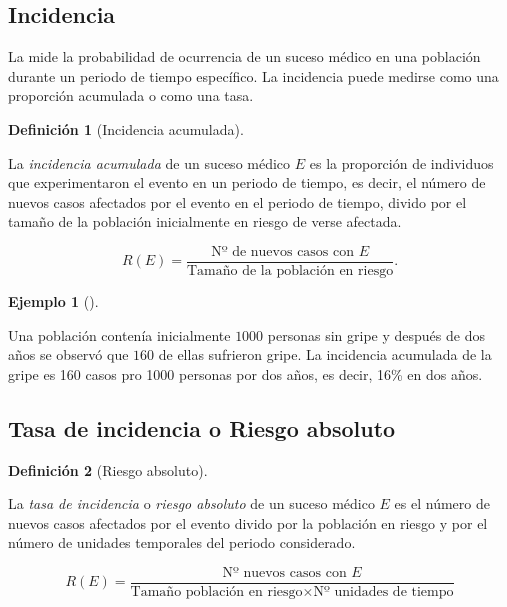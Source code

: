 \documentclass[
  spanish,
  a4paper,
]{scrreport}
\theoremstyle{plain}
\theoremstyle{definition}
\newtheorem{example}{Ejemplo}[chapter]
\theoremstyle{definition}
\newtheorem{definition}{Definición}[chapter]
\theoremstyle{remark}
\begin{document}
\subsection{Incidencia}\label{incidencia}

La mide la probabilidad de ocurrencia de un suceso médico en una
población durante un periodo de tiempo específico. La incidencia puede
medirse como una proporción acumulada o como una tasa.

\begin{definition}[Incidencia
acumulada]\protect\hypertarget{def-incidencia-acumulada}{}\label{def-incidencia-acumulada}

La \emph{incidencia acumulada} de un suceso médico \(E\) es la
proporción de individuos que experimentaron el evento en un periodo de
tiempo, es decir, el número de nuevos casos afectados por el evento en
el periodo de tiempo, divido por el tamaño de la población inicialmente
en riesgo de verse afectada.

\[R(E)=\frac{\mbox{Nº de nuevos casos con $E$}}{\mbox{Tamaño de la población en riesgo}}.\]

\end{definition}

\begin{example}[]\protect\hypertarget{exm-incidencia-acumulada}{}\label{exm-incidencia-acumulada}

Una población contenía inicialmente \(1000\) personas sin gripe y
después de dos años se observó que \(160\) de ellas sufrieron gripe. La
incidencia acumulada de la gripe es 160 casos pro 1000 personas por dos
años, es decir, 16\% en dos años.

\end{example}

\subsection{Tasa de incidencia o Riesgo
absoluto}\label{tasa-de-incidencia-o-riesgo-absoluto}

\begin{definition}[Riesgo
absoluto]\protect\hypertarget{def-riesgo-absoluto}{}\label{def-riesgo-absoluto}

La \emph{tasa de incidencia} o \emph{riesgo absoluto} de un suceso
médico \(E\) es el número de nuevos casos afectados por el evento divido
por la población en riesgo y por el número de unidades temporales del
periodo considerado.

\[R(E)=\frac{\mbox{Nº nuevos casos con $E$}}{\mbox{Tamaño población en riesgo}\times \mbox{Nº unidades de tiempo}}\]

\end{definition}
\end{document}
